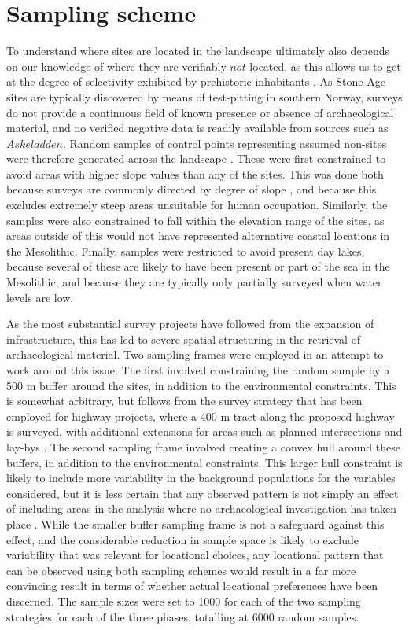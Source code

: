 \documentclass[12pt, a4paper]{article}
\begin{document}
\section{Sampling scheme}
To understand where sites are located in the landscape ultimately also depends on our knowledge of where they are verifiably $not$ located, as this allows us to get at the degree of selectivity exhibited by prehistoric inhabitants \citep[][2]{jochim1989}. As Stone Age sites are typically discovered by means of test-pitting in southern Norway, surveys do not provide a continuous field of known presence or absence of archaeological material, and no verified negative data is readily available from sources such as $Askeladden$. Random samples of control points representing assumed non-sites were therefore generated across the landscape \citep[e.g.][]{kvamme1988, fisher1997}. These were first constrained to avoid areas with higher slope values than any of the sites. This was done both because surveys are commonly directed by degree of slope \citep[e.g.][369]{nielsen2016}, and because this excludes extremely steep areas unsuitable for human occupation. Similarly, the samples were also constrained to fall within the elevation range of the sites, as areas outside of this would not have represented alternative coastal locations in the Mesolithic. Finally, samples were restricted to avoid present day lakes, because several of these are likely to have been present or part of the sea in the Mesolithic, and because they are typically only partially surveyed when water levels are low.\par   
  
As the most substantial survey projects have followed from the expansion of infrastructure, this has led to severe spatial structuring in the retrieval of archaeological material. Two sampling frames were employed in an attempt to work around this issue. The first involved constraining the random sample by a 500 m buffer around the sites, in addition to the environmental constraints. This is somewhat arbitrary, but follows from the survey strategy that has been employed for highway projects, where a 400 m tract along the proposed highway is surveyed, with additional extensions for areas such as planned intersections and lay-bys \citep[][7]{eskeland2017}. The second sampling frame involved creating a convex hull around these buffers, in addition to the environmental constraints. This larger hull constraint is likely to include more variability in the background populations for the variables considered, but it is less certain that any observed pattern is not simply an effect of including areas in the analysis where no archaeological investigation has taken place \citep[cf.][217]{kvamme2020}. While the smaller buffer sampling frame is not a safeguard against this effect, and the considerable reduction in sample space is likely to exclude variability that was relevant for locational choices, any locational pattern that can be observed using both sampling schemes would result in a far more convincing result in terms of whether actual locational preferences have been discerned. The sample sizes were set to 1000 for each of the two sampling strategies for each of the three phases, totalling at 6000 random samples.\par
\end{document}
